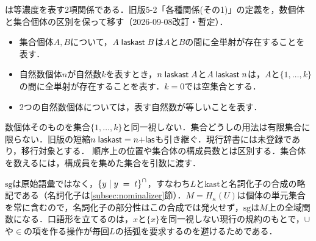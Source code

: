 \documentclass[../../main-detail.tex]{subfiles}
\begin{document}
\begin{remark}[等濃度と数詞]\label{rem:finite-cardinality}
    は等濃度を表す2項関係である．旧版5-2「各種関係(その1)」の定義を，数個体と集合個体の区別を保って移す（2026-09-08改訂・暫定）．
    \begin{itemize}
        \item 集合個体$A,B$について，$A\;\textsf{laskast}\;B$は$A$と$B$の間に全単射が存在することを表す．
        \item 自然数個体$n$が自然数$k$を表すとき，$n\;\textsf{laskast}\;A$と$A\;\textsf{laskast}\;n$は，$A$と$\{1,\ldots,k\}$の間に全単射が存在することを表す．$k=0$では空集合とする．
        \item 2つの自然数個体については，表す自然数が等しいことを表す．
    \end{itemize}
    数個体そのものを集合$\{1,\ldots,k\}$と同一視しない．集合どうしの用法は有限集合に限らない．旧版の短縮$n\;\textsf{laskast}=\textsf{$n$+las}$も引き継ぐ．現行辞書には未登録であり，移行対象とする．
    順序上の位置や集合体の構成員数とは区別する．集合体を数えるには，構成員を集めた集合を引数に渡す．
\end{remark}
\begin{remark}[単元集合は略記である]
    $\mathrm{sg}$は原始語彙ではなく，${{\{y \mid y\; =\; t\}}^\cap}$，すなわち$L$と$\mathrm{kast}$と名詞化子の合成の略記である（名詞化子は\ref{subsec:nominalizer}節）．$M = H_\kappa(U)$は個体の単元集合を常に含むので，名詞化子の部分性はこの合成では発火せず，$\mathrm{sg}$は$M$上の全域関数になる．口語形を立てるのは，$x$と$\{x\}$を同一視しない現行の規約のもとで，$\cup$や$\in$の項を作る操作が毎回$L$の括弧を要求するのを避けるためである．
\end{remark}
\end{document}
